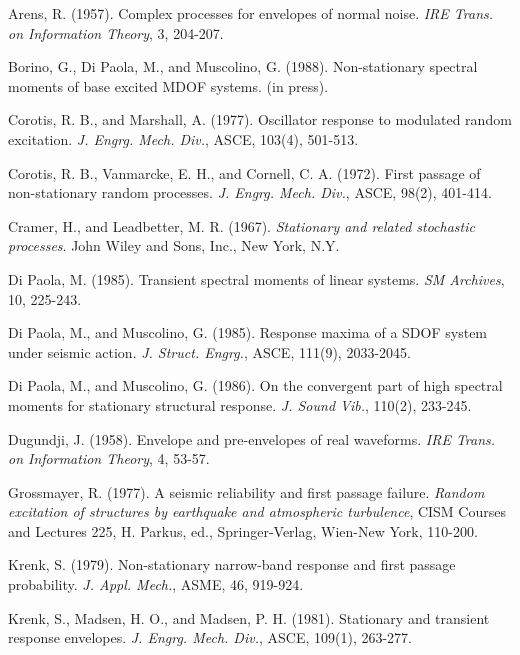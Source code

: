 \documentclass[11pt]{article}
\begin{document}
\begin{thebibliography}{99}

 Arens, R. (1957). Complex processes for envelopes of normal noise. \textit{IRE Trans. on Information Theory}, 3, 204-207.

 Borino, G., Di Paola, M., and Muscolino, G. (1988). Non-stationary spectral moments of base excited MDOF systems. (in press).

 Corotis, R. B., and Marshall, A. (1977). Oscillator response to modulated random excitation. \textit{J. Engrg. Mech. Div.}, ASCE, 103(4), 501-513.

 Corotis, R. B., Vanmarcke, E. H., and Cornell, C. A. (1972). First passage of non-stationary random processes. \textit{J. Engrg. Mech. Div.}, ASCE, 98(2), 401-414.

 Cramer, H., and Leadbetter, M. R. (1967). \textit{Stationary and related stochastic processes}. John Wiley and Sons, Inc., New York, N.Y.

 Di Paola, M. (1985). Transient spectral moments of linear systems. \textit{SM Archives}, 10, 225-243.

 Di Paola, M., and Muscolino, G. (1985). Response maxima of a SDOF system under seismic action. \textit{J. Struct. Engrg.}, ASCE, 111(9), 2033-2045.

 Di Paola, M., and Muscolino, G. (1986). On the convergent part of high spectral moments for stationary structural response. \textit{J. Sound Vib.}, 110(2), 233-245.

 Dugundji, J. (1958). Envelope and pre-envelopes of real waveforms. \textit{IRE Trans. on Information Theory}, 4, 53-57.

 Grossmayer, R. (1977). A seismic reliability and first passage failure. \textit{Random excitation of structures by earthquake and atmospheric turbulence}, CISM Courses and Lectures 225, H. Parkus, ed., Springer-Verlag, Wien-New York, 110-200.

 Krenk, S. (1979). Non-stationary narrow-band response and first passage probability. \textit{J. Appl. Mech.}, ASME, 46, 919-924.

 Krenk, S., Madsen, H. O., and Madsen, P. H. (1981). Stationary and transient response envelopes. \textit{J. Engrg. Mech. Div.}, ASCE, 109(1), 263-277.


\end{thebibliography}
\end{document}

